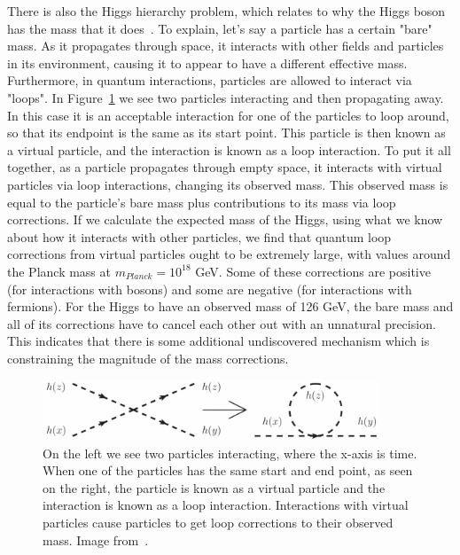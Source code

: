 There is also the Higgs hierarchy problem, which relates to why the Higgs boson has the mass that it does~\cite{SUSY_primer}. To explain, let's say a particle has a certain "bare" mass. As it propagates through space, it interacts with other fields and particles in its environment, causing it to appear to have a different effective mass. Furthermore, in quantum interactions, particles are allowed to interact via "loops". In Figure~\ref{fig:quantum_loops} we see two particles interacting and then propagating away. In this case it is an acceptable interaction for one of the particles to loop around, so that its endpoint is the same as its start point. This particle is then known as a virtual particle, and the interaction is known as a loop interaction. To put it all together, as a particle propagates through empty space, it interacts with virtual particles via loop interactions, changing its observed mass. This observed mass is equal to the particle's bare mass plus contributions to its mass via loop corrections. If we calculate the expected mass of the Higgs, using what we know about how it interacts with other particles, we find that quantum loop corrections from virtual particles ought to be extremely large, with values around the Planck mass at $m_{Planck} = 10^{18}$ GeV. Some of these corrections are positive (for interactions with bosons) and some are negative (for interactions with fermions). For the Higgs to have an observed mass of 126 GeV, the bare mass and all of its corrections have to cancel each other out with an unnatural precision. This indicates that there is some additional undiscovered mechanism which is constraining the magnitude of the mass corrections.

\begin{figure}[htbp]
    \centering
    \includegraphics[width=0.9\textwidth]{Images/Background/loop_correction.png}
    \caption{On the left we see two particles interacting, where the x-axis is time. When one of the particles has the same start and end point, as seen on the right, the particle is known as a virtual particle and the interaction is known as a loop interaction. Interactions with virtual particles cause particles to get loop corrections to their observed mass. Image from~\cite{loop_correction}.}
    \label{fig:quantum_loops}
\end{figure}

